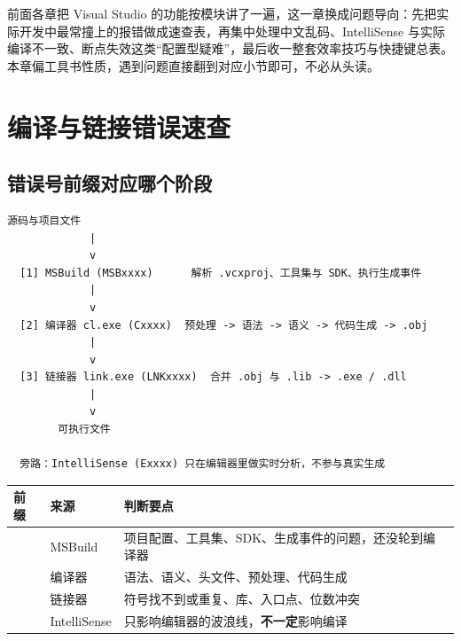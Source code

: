 前面各章把 Visual Studio 的功能按模块讲了一遍，这一章换成问题导向：先把实际开发中最常撞上的报错做成速查表，再集中处理中文乱码、IntelliSense 与实际编译不一致、断点失效这类“配置型疑难”，最后收一整套效率技巧与快捷键总表。本章偏工具书性质，遇到问题直接翻到对应小节即可，不必从头读。
\section{编译与链接错误速查}
\subsection{错误号前缀对应哪个阶段}
\begin{lstlisting}[style=textstyle]
        源码与项目文件
             |
             v
  [1] MSBuild (MSBxxxx)      解析 .vcxproj、工具集与 SDK、执行生成事件
             |
             v
  [2] 编译器 cl.exe (Cxxxx)  预处理 -> 语法 -> 语义 -> 代码生成 -> .obj
             |
             v
  [3] 链接器 link.exe (LNKxxxx)  合并 .obj 与 .lib -> .exe / .dll
             |
             v
        可执行文件

  旁路：IntelliSense (Exxxx) 只在编辑器里做实时分析，不参与真实生成
\end{lstlisting}
\begin{longtable}{L{1.8cm}L{2.6cm}L{10.2cm}}
\toprule
\textbf{前缀} & \textbf{来源} & \textbf{判断要点} \\
\midrule
{} & MSBuild & 项目配置、工具集、SDK、生成事件的问题，还没轮到编译器 \\
 & 编译器  & 语法、语义、头文件、预处理、代码生成 \\
 & 链接器  & 符号找不到或重复、库、入口点、位数冲突 \\
 & IntelliSense & 只影响编辑器的波浪线，\textbf{不一定}影响编译 \\
\bottomrule
\end{longtable}
